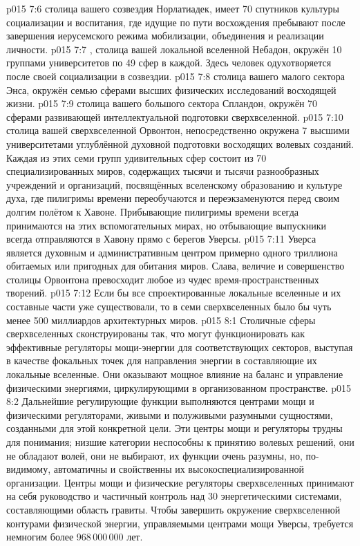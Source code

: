 \vs p015 7:6 \pc {} столица вашего созвездия Норлатиадек, имеет 70 спутников культуры социализации и воспитания, где идущие по пути восхождения пребывают после завершения иерусемского режима мобилизации, объединения и реализации личности.
\vs p015 7:7 \pc {}, столица вашей локальной вселенной Небадон, окружён 10 группами университетов по 49 сфер в каждой. Здесь человек одухотворяется после своей социализации в созвездии.
\vs p015 7:8 \pc {} столица вашего малого сектора Энса, окружён семью сферами высших физических исследований восходящей жизни.
\vs p015 7:9 \pc {} столица вашего большого сектора Спландон, окружён 70 сферами развивающей интеллектуальной подготовки сверхвселенной.
\vs p015 7:10 \pc {} столица вашей сверхвселенной Орвонтон, непосредственно окружена 7 высшими университетами углублённой духовной подготовки восходящих волевых созданий. Каждая из этих семи групп удивительных сфер состоит из 70 специализированных миров, содержащих тысячи и тысячи разнообразных учреждений и организаций, посвящённых вселенскому образованию и культуре духа, где пилигримы времени переобучаются и переэкзаменуются перед своим долгим полётом к Хавоне. Прибывающие пилигримы времени всегда принимаются на этих вспомогательных мирах, но отбывающие выпускники всегда отправляются в Хавону прямо с берегов Уверсы.
\vs p015 7:11 Уверса является духовным и административным центром примерно одного триллиона обитаемых или пригодных для обитания миров. Слава, величие и совершенство столицы Орвонтона превосходит любое из чудес время\hyp{}пространственных творений.
\vs p015 7:12 \pc Если бы все спроектированные локальные вселенные и их составные части уже существовали, то в семи сверхвселенных было бы чуть менее 500 миллиардов архитектурных миров.
\vs p015 8:1 Столичные сферы сверхвселенных сконструированы так, что могут функционировать как эффективные регуляторы мощи\hyp{}энергии для соответствующих секторов, выступая в качестве фокальных точек для направления энергии в составляющие их локальные вселенные. Они оказывают мощное влияние на баланс и управление физическими энергиями, циркулирующими в организованном пространстве.
\vs p015 8:2 Дальнейшие регулирующие функции выполняются центрами мощи и физическими регуляторами, живыми и полуживыми разумными сущностями, созданными для этой конкретной цели. Эти центры мощи и регуляторы трудны для понимания; низшие категории неспособны к принятию волевых решений, они не обладают волей, они не выбирают, их функции очень разумны, но, по\hyp{}видимому, автоматичны и свойственны их высокоспециализированной организации. Центры мощи и физические регуляторы сверхвселенных принимают на себя руководство и частичный контроль над 30 энергетическими системами, составляющими область гравиты. Чтобы завершить окружение сверхвселенной контурами физической энергии, управляемыми центрами мощи Уверсы, требуется немногим более 968\,000\,000 лет.
